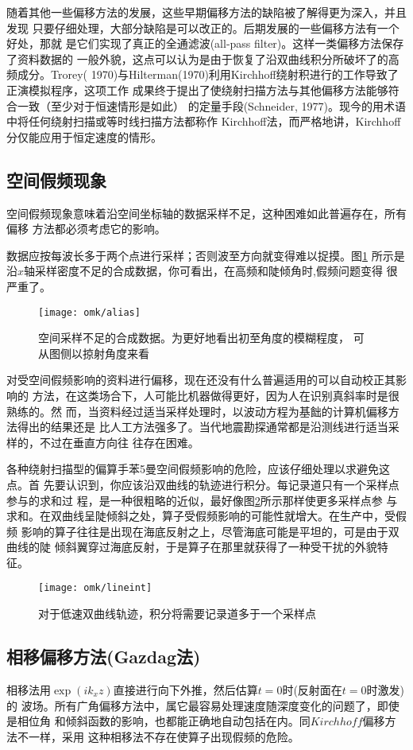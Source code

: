 随着其他一些偏移方法的发展，这些早期偏移方法的缺陷被了解得更为深入，并且发现
只要仔细处理，大部分缺陷是可以改正的。后期发展的一些偏移方法有一个好处，那就
是它们实现了真正的全通滤波(all-pass filter)。这样一类偏移方法保存了资料数据的
一般外貌，这点可以认为是由于恢复了沿双曲线积分所破坏了的高频成分。Trorey(
1970)与Hilterman(1970)利用Kirchhoff绕射积进行的工作导致了正演模拟程序，这项工作
成果终于提出了使绕射扫描方法与其他偏移方法能够符合一致（至少对于恒速情形是如此）
的定量手段(Schneider, 1977)。现今的用术语中将任何绕射扫描或等时线扫描方法都称作
Kirchhoff法，而严格地讲，Kirchhoff分仅能应用于恒定速度的情形。

\subsection{空间假频现象}
空间假频现象意味着沿空间坐标轴的数据采样不足，这种困难如此普遍存在，所有偏移
方法都必须考虑它的影响。

数据应按每波长多于两个点进行采样；否则波至方向就变得难以捉摸。图\ref{fig:omk/alias}
所示是沿$x$轴采样密度不足的合成数据，你可看出，在高频和陡倾角时,假频问题变得
很严重了。
\begin{figure}[H]
\centering
\texttt{[image: omk/alias]}
\caption[alias]{空间采样不足的合成数据。为更好地看出初至角度的模糊程度，
可从图侧以掠射角度来看}
\label{fig:omk/alias}
\end{figure}
对受空间假频影响的资料进行偏移，现在还没有什么普遍适用的可以自动校正其影响的
方法，在这类场合下，人可能比机器做得更好，因为人在识别真斜率时是很熟练的。然
而，当资料经过适当采样处理时，以波动方程为基飿的计算机偏移方法得出的结果还是
比人工方法强多了。当代地震勘探通常都是沿测线进行适当采样的，不过在垂直方向往
往存在困难。

各种绕射扫描型的偏算手苯5曼空间假频影响的危险，应该仔细处理以求避免这点。首
先要认识到，你应该沿双曲线的轨迹进行积分。每记录道只有一个采样点参与的求和过
程，是一种很粗略的近似，最好像图\ref{fig:omk/lineint}所示那样使更多采样点参
与求和。在双曲线呈陡倾斜之处，算子受假频影响的可能性就增大。在生产中，受假频
影响的算子往往是出现在海底反射之上，尽管海底可能是平坦的，可是由于双曲线的陡
倾斜翼穿过海底反射，于是算子在那里就获得了一种受干扰的外貌特征。
\begin{figure}[H]
\centering
\texttt{[image: omk/lineint]}
\caption[lineint]{对于低速双曲线轨迹，积分将需要记录道多于一个采样点}
\label{fig:omk/lineint}
\end{figure}

\subsection{相移偏移方法(Gazdag法)}
相移法用$\exp(ik_xz)$直接进行向下外推，然后估算$t=0$时(反射面在$t=0$时激发)的
波场。所有广角偏移方法中，属它最容易处理速度随深度变化的问题了，即使是相位角
和倾斜函数的影响，也都能正确地自动包括在内。同$Kirchhoff$偏移方法不一样，采用
这种相移法不存在使算子出现假频的危险。

